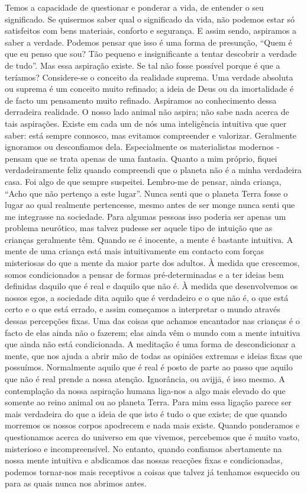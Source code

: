 Temos a capacidade de questionar e ponderar a vida, de entender o seu significado. Se quisermos saber qual o significado
da vida, não podemos estar só satisfeitos com bens materiais,
conforto e segurança.
E assim sendo, aspiramos a saber a verdade. Podemos
pensar que isso é uma forma de presunção, “Quem é que eu
penso que sou? Tão pequeno e insignificante a tentar descobrir
a verdade de tudo”. Mas essa aspiração existe. Se tal não fosse
possível porque é que a teríamos? Considere-se o conceito da
realidade suprema. Uma verdade absoluta ou suprema é um
conceito muito refinado; a ideia de Deus ou da imortalidade é
de facto um pensamento muito refinado. Aspiramos ao
conhecimento dessa derradeira realidade. O nosso lado animal
não aspira; não sabe nada acerca de tais aspirações. Existe em
cada um de nós uma inteligência intuitiva que quer saber: está
sempre connosco, mas evitamos compreender e valorizar.
Geralmente ignoramos ou desconfiamos dela. Especialmente
os materialistas modernos - pensam que se trata apenas de
uma fantasia.
Quanto a mim próprio, fiquei verdadeiramente feliz
quando compreendi que o planeta não é a minha verdadeira
casa. Foi algo de que sempre suspeitei. Lembro-me de pensar,
ainda criança, “Acho que não pertenço a este lugar”. Nunca
senti que o planeta Terra fosse o lugar ao qual realmente pertencesse, mesmo antes de ser monge nunca senti que me integrasse na sociedade. Para algumas pessoas isso poderia ser
apenas um problema neurótico, mas talvez pudesse ser aquele
tipo de intuição que as crianças geralmente têm. Quando se é
inocente, a mente é bastante intuitiva. A mente de uma criança
está mais intuitivamente em contacto com forças misteriosas
do que a mente da maior parte dos adultos. À medida que
crescemos, somos condicionados a pensar de formas pré-determinadas e a ter ideias bem definidas daquilo que é real
e daquilo que não é. À medida que desenvolvemos os nossos
egos, a sociedade dita aquilo que é verdadeiro e o que não é,
o que está certo e o que está errado, e assim começamos a
interpretar o mundo através dessas percepções fixas. Uma das
coisas que achamos encantador nas crianças é o facto de elas
ainda não o fazerem; elas ainda vêm o mundo com a mente
intuitiva que ainda não está condicionada.
A meditação é uma forma de descondicionar a mente,
que nos ajuda a abrir mão de todas as opiniões extremas e
ideias fixas que possuímos. Normalmente aquilo que é
real é posto de parte ao passo que aquilo que não é real
prende a nossa atenção. Ignorância, ou avijjā, é isso
mesmo.
A contemplação da nossa aspiração humana liga-nos a
algo mais elevado do que somente ao reino animal ou ao planeta Terra. Para mim essa ligação parece ser mais verdadeira do
que a ideia de que isto é tudo o que existe; de que quando
morremos os nossos corpos apodrecem e nada mais existe.
Quando ponderamos e questionamos acerca do universo em
que vivemos, percebemos que é muito vasto, misterioso e
incompreensível. No entanto, quando confiamos abertamente
na nossa mente intuitiva e abdicamos das nossas reacções
fixas e condicionadas, podemos tornar-nos mais receptivos a
coisas que talvez já tenhamos esquecido ou para as quais
nunca nos abrimos antes.

